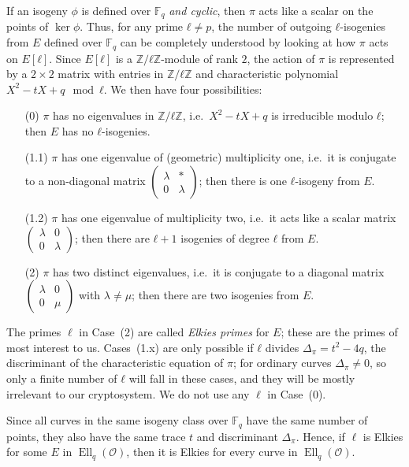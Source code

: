 \documentclass{llncs}
\newcommand{\F}{\mathbb{F}}
\renewcommand{\O}{\mathcal{O}}
\DeclareMathOperator{\Ell}{Ell}
\begin{document}
If an isogeny $ϕ$ is defined over $\F_q$ \emph{and cyclic},
then $π$ acts like a scalar on the points of $\ker ϕ$. 
Thus, for any prime $ℓ≠p$, the number of outgoing $ℓ$-isogenies from $E$ 
defined over $\F_q$ can be
completely understood by looking at how $π$ acts on $E[ℓ]$. Since $E[ℓ]$
is a $ℤ/ℓℤ$-module of rank $2$, the action of $π$ is represented by a
$2×2$ matrix with entries in $ℤ/ℓℤ$ and characteristic polynomial
$X^2-tX+q\mod ℓ$. We then have four possibilities:
\begin{itemize}
\item[(0)] $π$ has no eigenvalues in $ℤ/ℓℤ$, i.e.\ $X^2-tX+q$ is
  irreducible modulo $ℓ$; then $E$ has no $ℓ$-isogenies.
\item[(1.1)] $π$ has one eigenvalue of (geometric) multiplicity one,
  i.e.\ it is conjugate to a non-diagonal matrix
  $\left(\begin{smallmatrix}λ&*\\0&λ\end{smallmatrix}\right)$; then
  there is one $ℓ$-isogeny from $E$.
\item[(1.2)] $π$ has one eigenvalue of multiplicity two, i.e.\ it acts
  like a scalar matrix
  $\left(\begin{smallmatrix}λ&0\\0&λ\end{smallmatrix}\right)$; then
  there are $ℓ+1$ isogenies of degree $ℓ$ from $E$.
\item[(2)] $π$ has two distinct eigenvalues, i.e.\ it is conjugate to a
  diagonal matrix
  $\left(\begin{smallmatrix}λ&0\\0&μ\end{smallmatrix}\right)$
	with $\lambda\neq\mu$; then
  there are two isogenies from $E$.
\end{itemize}

The primes $\ell$ in Case~(2)
are called \emph{Elkies primes} for $E$;
these are the primes of most interest to us.
Cases~(1.x) are only possible if $ℓ$ divides $Δ_π = t^2-4q$,
the discriminant of the characteristic equation of $π$;
for ordinary curves $Δ_π≠0$, so only a finite number
of $ℓ$ will fall in these cases, and they will be mostly
irrelevant to our cryptosystem.
We do not use any $\ell$ in Case~(0).

Since all curves in
the same isogeny class over $\F_q$ have the same number of points,
they also have the same trace $t$ and discriminant $Δ_π$.
Hence, if $\ell$ is Elkies for some $E$ in $\Ell_q(\O)$,
then it is Elkies for every curve in $\Ell_q(\O)$.
\end{document}
